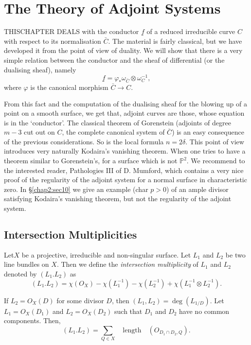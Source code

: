 
\chapter{The Theory of Adjoint Systems}\label{chap2}

THIS\pageoriginale CHAPTER DEALS with the conductor $\underline{f}$ of
a reduced irreducible curve $C$ with respect to its normalisation
$\bar{C}$. The material is fairly classical, but we have developed it
from the point of view of duality. We will show that there is a very
simple relation between the conductor and the sheaf of differential
(or the dualising sheaf), namely
$$
\underline{f}=\varphi_*\omega_{\bar{C}}\otimes\omega_C^{-1},
$$
where $\varphi$ is the canonical morphism $\bar{C}\longrightarrow C$. 

From this fact and the computation of the dualising sheaf for the
blowing up of a point on a smooth surface, we get that, adjoint curves
are those, whose equation is in the `conductor'. The classical theorem
of Gorenstein (adjoints of degree $m-3$ cut out on $C$, the complete
canonical system of $\bar{C}$) is an easy consequence of the previous
considerations. So is the local formula $n=2\delta$. This point of
view introduces very naturally Kodaira's vanishing theorem. When one
tries to have a theorem similar to Gorenstein's, for a surface which
is not $\mathbb{P}^2$. We recommend to the interested reader,
Pathologies III \cite{key8} of D. Mumford, which contains a very nice
proof of the regularity of the adjoint system for a normal surface in
characteristic zero. In \S \ref{chap2:sec10} we give an example (char
$p>0$) of an ample divisor satisfying Kodaira's vanishing theorem, but
not the regularity of the adjoint system.

\section{Intersection Multiplicities}\label{chap2:sec1}
Let\pageoriginale $X$ be a projective, irreducible and non-singular
surface. Let $L_1$ and $L_2$ be two line bundles on $X$. Then we
define the {\it intersection multiplicity} of $L_1$ and $L_2$ denoted
by $(L_1.L_2)$ as  
$$
(L_1.L_2)=\chi(O_X)-\chi(L_1^{-1})-\chi(L_2^{-1})+\chi(L_1^{-1} 
\otimes L_2^{-1}).
$$

If $L_2=O_X(D)$ for some divisor $D$, then $(L_1,L_2)=\deg
(L_{1/D})$. Let $L_1=O_X(D_1)$ and $L_2=O_X(D_2)$ such that $D_1$ and
$D_2$ have no common components. Then,
$$
(L_1.L_2)=\sum\limits_{Q\in X}\quad\text{length}\quad(O_{D_1\cap
D_2,Q}). 
$$

